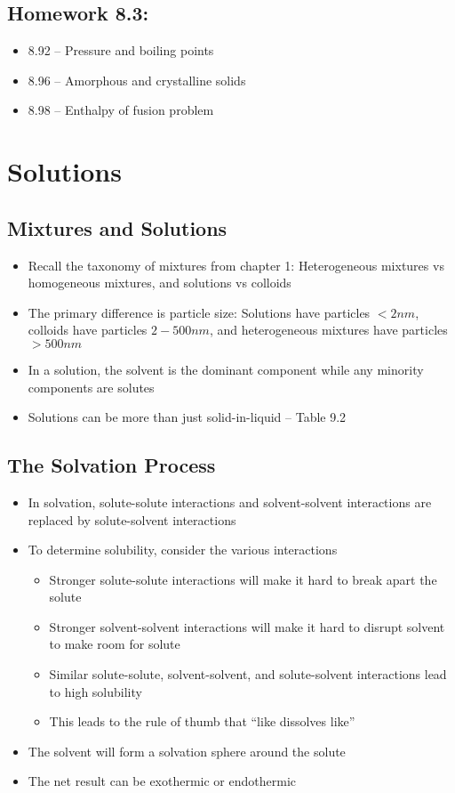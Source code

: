 \documentclass[12pt, openany, letterpaper]{memoir}
\begin{document}
\section*{Homework 8.3:}
\begin{itemize}
  \item 8.92 -- Pressure and boiling points
  \item 8.96 -- Amorphous and crystalline solids
  \item 8.98 -- Enthalpy of fusion problem
\end{itemize}

\chapter{Solutions}
\section{Mixtures and Solutions}
\begin{itemize}
	\item Recall the taxonomy of mixtures from chapter 1: Heterogeneous mixtures vs homogeneous mixtures, and solutions vs colloids
	\item The primary difference is particle size: Solutions have particles $<2nm$, colloids have particles $2-500nm$, and heterogeneous mixtures have particles $>500nm$
	\item In a solution, the solvent is the dominant component while any minority components are solutes
	\item Solutions can be more than just solid-in-liquid -- Table 9.2
\end{itemize}

\section{The Solvation Process}
\begin{itemize}
	\item In solvation, solute-solute interactions and solvent-solvent interactions are replaced by solute-solvent interactions
	\item To determine solubility, consider the various interactions
	      \begin{itemize}
		      \item Stronger solute-solute interactions will make it hard to break apart the solute
		      \item Stronger solvent-solvent interactions will make it hard to disrupt solvent to make room for solute
		      \item Similar solute-solute, solvent-solvent, and solute-solvent interactions lead to high solubility
		      \item This leads to the rule of thumb that ``like dissolves like''
	      \end{itemize}
	\item The solvent will form a solvation sphere around the solute
	\item The net result can be exothermic or endothermic
\end{itemize}
\end{document}
